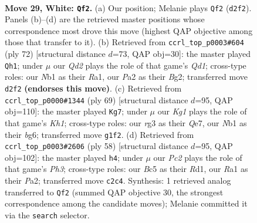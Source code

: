 \documentclass[11pt]{article}
\begin{document}
\clearpage

\begin{figure}[p]\centering
\begin{subfigure}{0.46\textwidth}\centering
\resizebox{\linewidth}{!}{%
\newchessgame
\chessboard[
  setfen={rnb1k3/8/4q3/p1Bp4/1p3R2/6r1/PPPQ2P1/RN4K1 w - - 4 29},
  showmover=false,
  pgfstyle=straightmove, color=movearrow, markmove={d2-f2}
]}
\caption{}
\end{subfigure}\hfill
\begin{subfigure}{0.46\textwidth}\centering
\resizebox{\linewidth}{!}{%
\newchessgame
\chessboard[
  setfen={2r5/6rk/1P2pq2/3p1p2/p1NP1Pb1/2R5/P3P1BK/R2Q4 w - - 1 37},
  showmover=false,
  pgfstyle=straightmove, color=movearrow, markmove={d1-h1}
]}
\caption{}
\end{subfigure}
\\[4pt]
\begin{subfigure}{0.46\textwidth}\centering
\resizebox{\linewidth}{!}{%
\newchessgame
\chessboard[
  setfen={7k/1p2q3/4P1Bp/3p2pQ/p4r2/P7/1b3PpP/4R1K1 b - - 1 35},
  showmover=false,
  pgfstyle=straightmove, color=movearrow, markmove={h8-g7}
]}
\caption{}
\end{subfigure}\hfill
\begin{subfigure}{0.46\textwidth}\centering
\resizebox{\linewidth}{!}{%
\newchessgame
\chessboard[
  setfen={3qr1k1/1b5p/p1p4B/3r2p1/1P1P1pQ1/7P/P1R2P2/3R2K1 w - - 0 30},
  showmover=false,
  pgfstyle=straightmove, color=movearrow, markmove={h3-h4}
]}
\caption{}
\end{subfigure}
\caption{\textbf{Move 29, White: \texttt{Qf2}.} (a) Our position; Melanie plays \texttt{Qf2} (\texttt{d2f2}). Panels (b)--(d) are the retrieved master positions whose correspondence most drove this move (highest QAP objective among those that transfer to it). (b) Retrieved from \texttt{ccrl\_top\_p0003\#604} (ply 72) [structural distance $d$=73, QAP obj=30]: the master played \texttt{Qh1}; under $\mu$ our \emph{Qd2} plays the role of that game's \emph{Qd1}; cross-type roles: our \emph{N}b1 as their \emph{R}a1, our \emph{P}a2 as their \emph{B}g2; transferred move \texttt{d2f2} \textbf{(endorses this move)}. (c) Retrieved from \texttt{ccrl\_top\_p0000\#1344} (ply 69) [structural distance $d$=95, QAP obj=110]: the master played \texttt{Kg7}; under $\mu$ our \emph{Kg1} plays the role of that game's \emph{Kh1}; cross-type roles: our \emph{r}g3 as their \emph{Q}e7, our \emph{N}b1 as their \emph{b}g6; transferred move \texttt{g1f2}. (d) Retrieved from \texttt{ccrl\_top\_p0003\#2606} (ply 58) [structural distance $d$=95, QAP obj=102]: the master played \texttt{h4}; under $\mu$ our \emph{Pc2} plays the role of that game's \emph{Ph3}; cross-type roles: our \emph{B}c5 as their \emph{R}d1, our \emph{R}a1 as their \emph{P}a2; transferred move \texttt{c2c4}. Synthesis: 1 retrieved analog transferred to \texttt{Qf2} (summed QAP objective 30, the strongest correspondence among the candidate moves); Melanie committed it via the \texttt{search} selector.}
\label{fig:thought-m56}
\end{figure}
\end{document}
